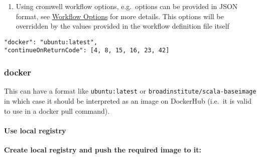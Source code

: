 \documentclass[
]{book}
\providecommand{\tightlist}{%
  \setlength{\itemsep}{0pt}\setlength{\parskip}{0pt}}
\begin{document}
\begin{enumerate}
\def\labelenumi{\arabic{enumi}.}
\tightlist
\item
  Using cromwell workflow options, e.g.~options can be provided in JSON format,
  see \href{https://cromwell.readthedocs.io/en/stable/wf_options/Overview/}{Workflow Options}
  for more details. This options will be overridden by the values provided in
  the workflow definition file itself
\end{enumerate}

\begin{verbatim}
"docker": "ubuntu:latest",
"continueOnReturnCode": [4, 8, 15, 16, 23, 42]
\end{verbatim}

\hypertarget{docker}{%
\subsubsection*{docker}\label{docker}}

This can have a format like \texttt{ubuntu:latest} or \texttt{broadinstitute/scala-baseimage}
in which case it should be interpreted as an image on DockerHub (i.e.~it is valid to use in a docker pull command).

\hypertarget{use-local-registry}{%
\paragraph{Use local registry}\label{use-local-registry}}

\textbf{Create local registry and push the required image to it:}
\end{document}
